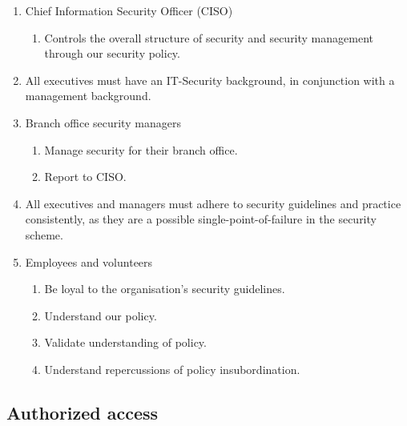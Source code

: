 \begin{enumerate}
\begin{enumerate}
  \end{enumerate}
  \item Chief Information Security Officer (CISO)
  \begin{enumerate}
    \item Controls the overall structure of security and security management through our security policy.
  \end{enumerate}
  \item All executives must have an IT-Security background, in conjunction with a management background.
  \item Branch office security managers
  \begin{enumerate}
     \item Manage security for their branch office.
     \item Report to CISO.
  \end{enumerate}
  \item All executives and managers must adhere to security guidelines and practice consistently, as they are a possible single-point-of-failure in the security scheme.
  \item Employees and volunteers
  \begin{enumerate}
    \item Be loyal to the organisation's security guidelines.
    \item Understand our policy.
    \item Validate understanding of policy.
    \item Understand repercussions of policy insubordination.
  \end{enumerate}
\end{enumerate}

\subsection{Authorized access}

